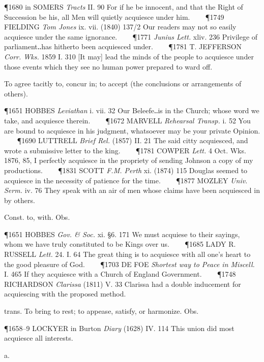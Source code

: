 \begin{description}[wide, labelwidth=!, labelindent=0pt]
\begin{myenumerate}
\P 1680 in SOMERS \textit{Tracts} II. 90 For if he be innocent, and that the Right of Succession be his, all Men will quietly acquiesce under him.    
\P 1749 FIELDING \textit{Tom Jones} ix. vii. (1840) 137/2 Our readers may not so easily acquiesce under the same ignorance.    
\P 1771 \textit{Junius Lett.} xliv. 236 Privilege of parliament‥has hitherto been acquiesced under.    
\P 1781 T. JEFFERSON \textit{Corr. Wks.} 1859 I. 310 [It may] lead the minds of the people to acquiesce under those events which they see no human power prepared to ward off.

 To agree tacitly to, concur in; to accept (the conclusions or arrangements of others). 

\P 1651 HOBBES \textit{Leviathan} i. vii. 32 Our Beleefe‥is in the Church; whose word we take, and acquiesce therein.    
\P 1672 MARVELL \textit{Rehearsal Transp.} i. 52 You are bound to acquiesce in his judgment, whatsoever may be your private Opinion.    
\P 1690 LUTTRELL \textit{Brief Rel.} (1857) II. 21 The said citty acquiesced, and wrote a submissive letter to the king.    
\P 1781 COWPER \textit{Lett.} 4 Oct. Wks. 1876, 85, I perfectly acquiesce in the propriety of sending Johnson a copy of my productions.    
\P 1831 SCOTT \textit{F.M. Perth} xi. (1874) 115 Douglas seemed to acquiesce in the necessity of patience for the time.    
\P 1877 MOZLEY \textit{Univ. Serm.} iv. 76 They speak with an air of men whose claims have been acquiesced in by others.

 Const. to, with. Obs. 

\P 1651 HOBBES \textit{Gov. \& Soc.} xi. §6. 171 We must acquiese to their sayings, whom we have truly constituted to be Kings over us.    
\P 1685 LADY R. RUSSELL \textit{Lett.} 24. I. 64 The great thing is to acquiesce with all one's heart to the good pleasure of God.    
\P 1703 DE FOE \textit{Shortest way to Peace in Miscell.} I. 465 If they acquiesce with a Church of England Government.    
\P 1748 RICHARDSON \textit{Clarissa} (1811) V. 33 Clarissa had a double inducement for acquiescing with the proposed method.

 trans. To bring to rest; to appease, satisfy, or harmonize. Obs. 

\P 1658–9 LOCKYER in Burton \textit{Diary} (1628) IV. 114 This union did most acquiesce all interests.
\end{myenumerate}


  a.


\end{description}
